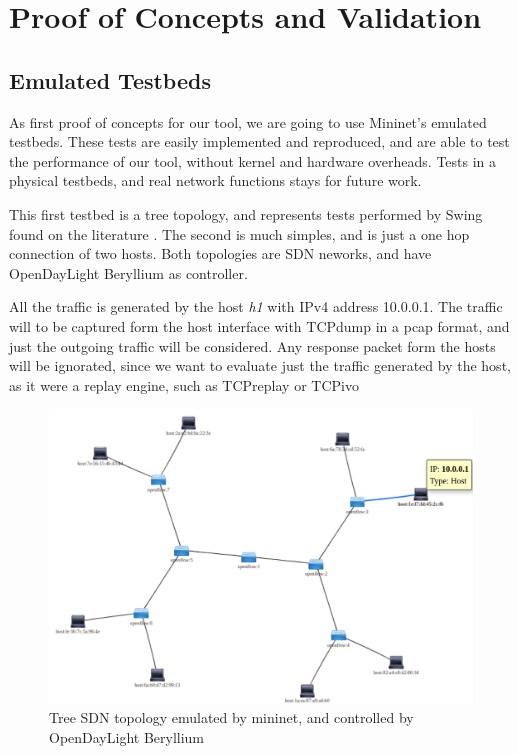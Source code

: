 \chapter{Proof of Concepts and Validation}\label{ch:validation}

\section{Emulated Testbeds}


As first proof of concepts for our tool, we are going to use Mininet's emulated testbeds. These tests are easily implemented and reproduced, and are able to test the performance of our tool, without kernel and hardware overheads. Tests in a physical testbeds, and real network functions stays for future work.

This first testbed is a tree topology, and represents tests performed by Swing\cite{swing-paper} found on the literature \cite{background-traffic-matter}\cite{legotg-paper}. The second is much simples, and is just a one hop connection of two hosts. Both topologies are SDN neworks, and have OpenDayLight Beryllium as controller. 


All the traffic is generated by the host \textit{h1} with IPv4 address 10.0.0.1. The traffic will to be captured form the host interface with TCPdump in a pcap format, and just the outgoing traffic will be considered. Any response packet form the hosts will be ignorated, since we want to evaluate just the traffic generated by the host, as it were a replay engine, such as TCPreplay or TCPivo\cite{tcpivo-paper}


\begin{figure}[!ht]
	\centering
	\includegraphics[scale=0.4]{figures/ch5/topo-tree}
	\caption{Tree SDN topology emulated by mininet, and controlled by OpenDayLight Beryllium}
	\label{fig:topo-tree}
\end{figure}

